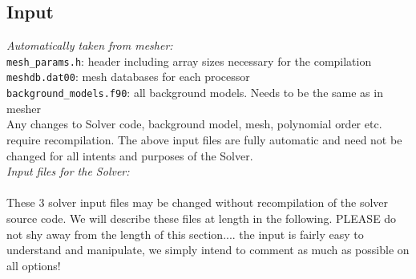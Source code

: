 \documentclass[11pt,letter,fleqn,english,notitlepage]{article}
\begin{document}

\subsection{Input}

\textit{Automatically taken from mesher:} \\
{\tt mesh\_params.h}: header including array sizes necessary for the compilation\\
{\tt meshdb.dat00\*}: mesh databases for each processor\\
{\tt background\_models.f90}: all background models. Needs to be the same as in mesher\\

\noindent Any changes to Solver code, background model, mesh, polynomial order etc. require 
recompilation. The above input files are fully automatic and need not be changed for all intents 
and purposes of the Solver.\\

\noindent \textit{Input files for the Solver:} \\
\\
These 3 solver input files may be changed without recompilation of the solver 
source code. We will describe these files at length in the following. PLEASE do not shy away from the 
length of this section.... the input is fairly easy to understand and manipulate, 
we simply intend to comment as much as possible on all options!\\
\end{document}
